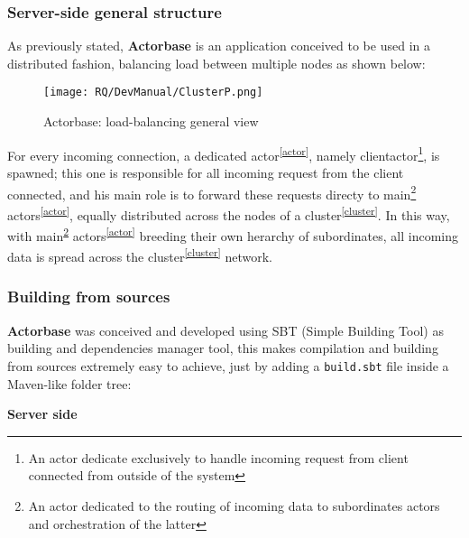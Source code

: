 \documentclass{scalatekids-article}
\begin{document}
\subsubsection{Server-side general structure}

As previously stated, \textbf{Actorbase} is an application conceived to be used in a distributed fashion,
balancing load between multiple nodes as shown below:

\begin{figure}[H]
  \begin{center}
    \texttt{[image: RQ/DevManual/ClusterP.png]}
    \caption{Actorbase: load-balancing general view}
  \end{center}
\end{figure}

For every incoming connection, a dedicated actor\textsuperscript{\ref{actor}}, namely clientactor\footnote{An actor dedicate
exclusively to handle incoming request from client connected from outside of the
system}, is spawned; this one is responsible for all incoming request from the
client connected, and his main role is to forward these requests directy to
main\footnote{An actor dedicated to the routing of incoming data to subordinates
actors and orchestration of the latter\label{main}}
actors\textsuperscript{\ref{actor}}, equally distributed across the nodes of a
cluster\textsuperscript{\ref{cluster}}. In this way, with
main\textsuperscript{\ref{main}} actors\textsuperscript{\ref{actor}} breeding
their own herarchy of subordinates, all incoming data is spread across the
cluster\textsuperscript{\ref{cluster}} network.

\subsubsection{Building from sources}

\textbf{Actorbase} was conceived and developed using SBT (Simple Building Tool) as building and dependencies
manager tool, this makes compilation and building from sources extremely easy to achieve, just by adding a
\verb=build.sbt= file inside a Maven-like folder tree:

\textbf{Server side}

\end{document}
